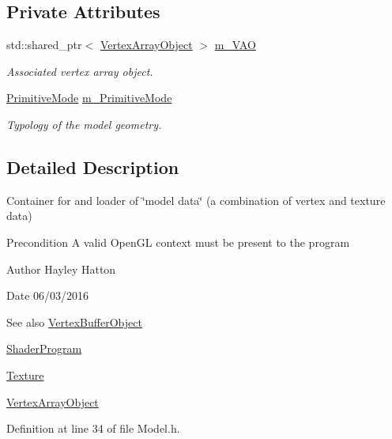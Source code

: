 \subsection*{Private Attributes}
\begin{DoxyCompactItemize}
\item 
std\+::shared\+\_\+ptr$<$ \hyperlink{class_vertex_array_object}{Vertex\+Array\+Object} $>$ \hyperlink{class_model_a33ddd71b6e11029a482f8fd0786d064d}{m\+\_\+\+V\+AO}
\begin{DoxyCompactList}\small\item\em Associated vertex array object. \end{DoxyCompactList}\item 
\hyperlink{_model_8h_a8e9638a65349c0abba4e6b97c8251994}{Primitive\+Mode} \hyperlink{class_model_af07134f1b940eb354fa85c3524d70411}{m\+\_\+\+Primitive\+Mode}
\begin{DoxyCompactList}\small\item\em Typology of the model geometry. \end{DoxyCompactList}\end{DoxyCompactItemize}


\subsection{Detailed Description}
Container for and loader of \char`\"{}model data\char`\"{} (a combination of vertex and texture data) 

\begin{DoxyPrecond}{Precondition}
A valid Open\+GL context must be present to the program 
\end{DoxyPrecond}
\begin{DoxyAuthor}{Author}
Hayley Hatton 
\end{DoxyAuthor}
\begin{DoxyDate}{Date}
06/03/2016 
\end{DoxyDate}
\begin{DoxySeeAlso}{See also}
\hyperlink{class_vertex_buffer_object}{Vertex\+Buffer\+Object} 

\hyperlink{class_shader_program}{Shader\+Program} 

\hyperlink{class_texture}{Texture} 

\hyperlink{class_vertex_array_object}{Vertex\+Array\+Object} 
\end{DoxySeeAlso}


Definition at line 34 of file Model.\+h.



